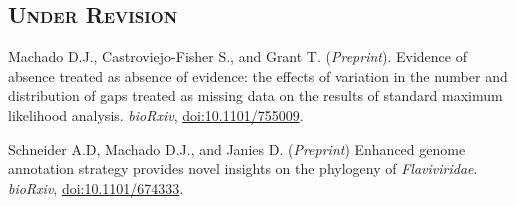 \subsection{\textsc{Under Revision}}

	{
	\setlength{\parskip}{.5em}\renewcommand{\baselinestretch}{2.0}
	\begin{hangparas}{.25in}{1}
			
		Machado D.J., Castroviejo-Fisher S., and Grant T. (\emph{Preprint}). Evidence of absence treated as absence of evidence: the effects of variation in the number and distribution of gaps treated as missing data on the results of standard maximum likelihood analysis. \emph{bioRxiv}, \href{https://doi.org/10.1101/755009}{doi:10.1101/755009}.
		
		Schneider A.D,  Machado D.J., and Janies D. (\emph{Preprint}) Enhanced genome annotation strategy provides novel insights on the phylogeny of \emph{Flaviviridae}. \emph{bioRxiv}, \href{http://dx.doi.org/10.1101/674333}{doi:10.1101/674333}.
			
	\end{hangparas}
}
